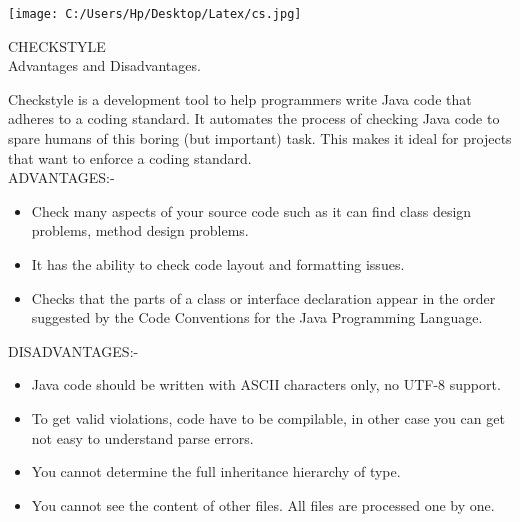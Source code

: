 \documentclass[10pt]{article}
\begin{document}
 \noindent\begin{minipage}{0.3\textwidth}%
 	\texttt{[image: C:/Users/Hp/Desktop/Latex/cs.jpg]}
 \end{minipage}%
 \hfill%
 \begin{minipage}{0.6\textwidth}\raggedleft
 	CHECKSTYLE\\
 	Advantages and Disadvantages.
 \end{minipage}
 \newline
 \newline
 Checkstyle is a development tool to help programmers write Java code that adheres to a coding standard. It automates the process of checking Java code to spare humans of this boring (but important) task. This makes it ideal for projects that want to enforce a coding standard. \\
 \newline
 ADVANTAGES:-
 \begin{itemize} [noitemsep,topsep=0pt]
 	\item Check many aspects of your source code such as it can find class design problems, method design problems. 
 	\item It has the ability to check code layout and formatting issues.
 	\item Checks that the parts of a class or interface declaration appear in the order suggested by the Code Conventions for the Java Programming Language.
 	 \end{itemize}

 DISADVANTAGES:-
 \begin{itemize} [noitemsep,topsep=0pt]
 	\item Java code should be written with ASCII characters only, no UTF-8 support.
 	\item To get valid violations, code have to be compilable, in other case you can get not easy to understand parse errors.
 	\item You cannot determine the full inheritance hierarchy of type.
 	\item You cannot see the content of other files. All files are processed one by one.
 \end{itemize}
\end{document}
